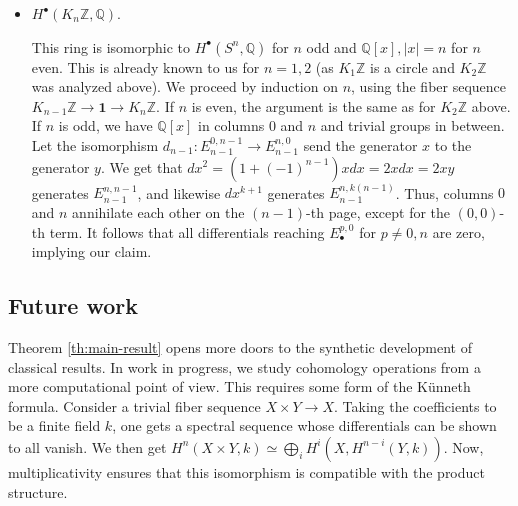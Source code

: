 \documentclass{amsart}
\theoremstyle{definition}
\newcommand{\ZZ}{\mathbb{Z}}
\newcommand{\sgtn}{\mathbf{1}}
\begin{document}
\begin{itemize}
    Let $X$ be the 3-connected cover of $S^3$.
    There is a fiber sequence $K_2\ZZ \to X \to S^3$. Since the term $(0,2)$ does not survive in $E_\infty$, the differential $d_2^{0,2}$ is an isomorphism. It then follows from the Leibniz formula that for all positive $k$, $d_2^{0,2k}$ is multiplication by $k$. (Note that this is the first time when our sign $(-1)^{qt}$ enters. However, it doesn't have any importance.) Thus,
    $$H^k(X, \ZZ) = \begin{cases}
        \ZZ/m\ZZ, & k = 2m + 1,\ m = 2, 3, 4, \ldots \\
        0, & k \neq 5, 7, 9, \ldots
    \end{cases}.$$

    Note that if we had the universal coefficient theorem, or at least a nontrivial mapping $H^5(X) \to H_4(X),$ this would compute the Brunerie number.

\item
    $H^\bullet(K_n\ZZ, \mathbb{Q})$.

    This ring is isomorphic to $H^\bullet(S^n, \mathbb{Q})$ for $n$ odd and $\mathbb{Q}[x], |x|=n$ for $n$ even. This is already known to us for $n=1, 2$ (as $K_1 \ZZ$ is a circle and $K_2 \ZZ$ was analyzed above). We proceed by induction on $n$, using the fiber sequence $K_{n-1}\ZZ \to \sgtn \to K_{n}\ZZ$. If $n$ is even, the argument is the same as for $K_2 \ZZ$ above. If $n$ is odd, we have $\mathbb{Q}[x]$ in columns $0$ and $n$ and trivial groups in between.
    Let the isomorphism $d_{n-1}: E_{n-1}^{0,n-1} \to E_{n-1}^{n, 0}$ send the generator $x$ to the generator $y$. We get that $dx^2=(1+(-1)^{n-1})xdx = 2xdx = 2xy$ generates $E_{n-1}^{n,n-1}$, and likewise $dx^{k+1}$ generates $E_{n-1}^{n,k(n-1)}$. Thus, columns $0$ and $n$ annihilate each other on the $(n-1)$-th page, except for the $(0,0)$-th term. It follows that all differentials reaching $E_\bullet^{p,0}$ for $p \neq 0, n$ are zero, implying our claim.


\end{itemize}

\subsection{Future work}
Theorem \ref{th:main-result} opens more doors to the synthetic development of classical results. In work in progress, we study cohomology operations from a more computational point of view. This requires some form of the K\"unneth formula. Consider a trivial fiber sequence $X \times Y \to X$. Taking the coefficients to be a finite field $k$, one gets a spectral sequence whose differentials can be shown to all vanish. We then get $H^n(X \times Y, k) \simeq \bigoplus_i H^i(X, H^{n-i}(Y, k))$. Now, multiplicativity ensures that this isomorphism is compatible with the product structure.
\end{document}

